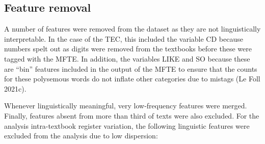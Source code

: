 \documentclass[
  letterpaper,
  DIV=11,
  numbers=noendperiod]{scrreprt}
\begin{document}
\subsection{Feature removal}\label{feature-removal}

A number of features were removed from the dataset as they are not
linguistically interpretable. In the case of the TEC, this included the
variable CD because numbers spelt out as digits were removed from the
textbooks before these were tagged with the MFTE. In addition, the
variables LIKE and SO because these are ``bin'' features included in the
output of the MFTE to ensure that the counts for these polysemous words
do not inflate other categories due to mistags (Le Foll 2021c).

Whenever linguistically meaningful, very low-frequency features were
merged. Finally, features absent from more than third of texts were also
excluded. For the analysis intra-textbook register variation, the
following linguistic features were excluded from the analysis due to low
dispersion:
\end{document}
